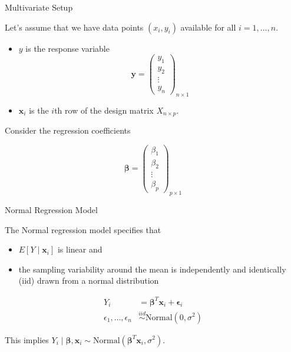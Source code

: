 \documentclass[
  ignorenonframetext,
]{beamer}
\providecommand{\tightlist}{%
  \setlength{\itemsep}{0pt}\setlength{\parskip}{0pt}}
\newcommand{\bx}   {\bm{x}}
\newcommand{\by}   {\bm{y}}
\newcommand{\bbeta}{\bm{\beta}}
\begin{document}
\begin{frame}{Multivariate Setup}
\protect\hypertarget{multivariate-setup}{}

Let's assume that we have data points \((x_i, y_i)\) available for all
\(i=1,\ldots,n.\)

\begin{itemize}
\item
  \(y\) is the response variable \[  \by= \left( \begin{array}{c}
  y_1\\
  y_2\\
  \vdots\\
  y_n
  \end{array} \right)_{n \times 1} \]
\item
  \(\bx_{i}\) is the \(i\)th row of the design matrix
  \(X_{n \times p}.\)
\end{itemize}

Consider the regression coefficients

\[  \bbeta = \left( \begin{array}{c}
\beta_{1}\\
\beta_{2}\\
\vdots\\
\beta_{p}
\end{array} \right)_{p \times 1} \]

\end{frame}

\begin{frame}{Normal Regression Model}
\protect\hypertarget{normal-regression-model}{}

The Normal regression model specifies that

\begin{itemize}
\tightlist
\item
  \(E[Y\mid \bx_i]\) is linear and
\item
  the sampling variability around the mean is independently and
  identically (iid) drawn from a normal distribution
\end{itemize}

\begin{align}
Y_i &= \bbeta^T \bx_i + \bm{\epsilon}_i\\
\epsilon_1,\ldots,\epsilon_n &\stackrel{iid}{\sim} \text{Normal}(0,\sigma^2)
\end{align}

This implies
\(Y_i \mid \bbeta, \bx_i \sim \text{Normal}(\bbeta^T \bx_i,\sigma^2).\)

\end{frame}
\end{document}
